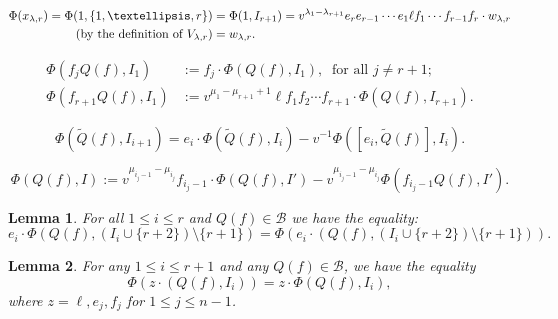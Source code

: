 \documentclass[10pt,a4paper]{amsart}
\newtheorem{lemma}{Lemma}
\newcommand{\bb}{\mathcal{B}}
\newcommand{\sm}{\setminus}
\begin{document}
\begin{align}\notag\Phi(x_{\lambda,r})=\Phi(1,\{1,\ldots,r\})& =\Phi(1,I_{r+1})=v^{\lambda_1-\lambda_{r+1}}e_re_{r-1}\cdots e_1\ell f_1\cdots f_{r-1}f_r\cdot w_{\lambda, r}\\
\label{eq:topvect}\text{ (by the definition of $V_{\lambda,r}$)} & = w_{\lambda,r}.
\end{align}

\begin{align}\label{eq:Phi-fj}\Phi(f_jQ(f),I_1)&:=f_j\cdot \Phi(Q(f),I_1),~\text{ for all }j\neq r+1; \\
\label{eq:Phi-fr}\Phi(f_{r+1}Q(f),I_{1})&:=v^{\mu_1-\mu_{r+1}+1}\ell f_1f_2\cdots f_{r+1} \cdot \Phi(Q(f),I_{r+1}).\end{align}

\begin{equation}\label{eq:Phi-I+1}\Phi(\widetilde Q(f),I_{i+1})=e_i\cdot \Phi(\widetilde Q(f), I_i)-v^{-1}\Phi([e_i,\widetilde Q(f)], I_{i}).\end{equation}

\begin{equation}\label{eq:Phi-I'}\Phi(Q(f),I):=v^{\mu_{i_j-1}-\mu_{i_j}}f_{i_j-1}\cdot \Phi(Q(f),I') - v^{\mu_{i_j-1}-\mu_{{i_j}}}\Phi(f_{i_j-1}Q(f), I').\end{equation}

\begin{lemma}\label{lem:Phi-ei}
For all $1\leq i\leq r$ and $Q(f)\in \bb$ we have the equality:
\[e_i\cdot \Phi(Q(f), (I_{i}\cup\{r+2\})\sm \{r+1\}) =  \Phi(e_i\cdot(Q(f), (I_{i}\cup\{r+2\})\sm \{r+1\})).\]
\end{lemma}

\begin{lemma} \label{lem:I_r+1}
For any $1\leq i\leq r+1$ and any $Q(f)\in \mathcal B$, we have the equality
\[\Phi(z\cdot(Q(f), I_i)) = z\cdot \Phi(Q(f), I_i),\] where $z=\ell,e_j,f_j$ %
for $1\leq j\leq n-1$.
\end{lemma}
\end{document}
